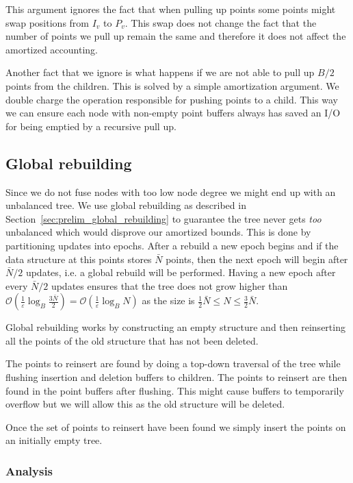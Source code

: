 \documentclass[twoside,11pt,openright]{report}
\def \epsilon {\varepsilon}
\begin{document}
This argument ignores the fact that when pulling up points some points might swap positions from $I_v$ to $P_v$. This swap does not change the fact that the number of points we pull up remain the same and therefore it does not affect the amortized accounting.

Another fact that we ignore is what happens if we are not able to pull up $B/2$ points from the children. This is solved by a simple amortization argument. We double charge the operation responsible for pushing points to a child. This way we can ensure each node with non-empty point buffers always has saved an I/O for being emptied by a recursive pull up.

\subsection{Global rebuilding}
Since we do not fuse nodes with too low node degree we might end up with an unbalanced tree. We use global rebuilding as described in Section~\ref{sec:prelim_global_rebuilding} to guarantee the tree never gets \textit{too} unbalanced which would disprove our amortized bounds. This is done by partitioning updates into epochs. After a rebuild a new epoch begins and if the data structure at this points stores $\bar{N}$ points, then the next epoch will begin after $\bar{N}/2$ updates, i.e. a global rebuild will be performed.
Having a new epoch after every $\bar{N}/2$ updates ensures that the tree does not grow higher than $\mathcal{O}\left(\frac{1}{\epsilon}\log_B\frac{3\bar{N}}{2}\right) = \mathcal{O}\left(\frac{1}{\epsilon}\log_B N\right)$ as the size is $\frac{1}{2}\bar{N} \leq N \leq \frac{3}{2}\bar{N}$.

Global rebuilding works by constructing an empty structure and then reinserting all the points of the old structure that has not been deleted.

The points to reinsert are found by doing a top-down traversal of the tree while flushing insertion and deletion buffers to children. The points to reinsert are then found in the point buffers after flushing. This might cause buffers to temporarily overflow but we will allow this as the old structure will be deleted.

Once the set of points to reinsert have been found we simply insert the points on an initially empty tree.

\subsubsection*{Analysis}
\end{document}

